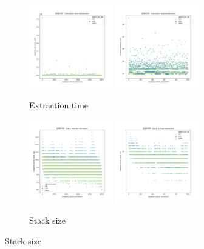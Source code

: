 \begin{figure}
    \begin{subfigure}[b]{\textwidth}
        \centering
        \includegraphics[width=0.40\textwidth]{./fragments/05_workhorse_experiment/images/01_basebenchmark_01_random_case.png.1_0.png}
        \includegraphics[width=0.40\textwidth]{./fragments/05_workhorse_experiment/images/01_basebenchmark_01_random_case.png.1_1.png}
        \caption{Extraction time}
        \label{FIG:WORKHORSE_BENCHMARK_01__0_0}
    \end{subfigure}

    \begin{subfigure}[b]{\textwidth}
        \centering
        \includegraphics[width=0.40\textwidth]{./fragments/05_workhorse_experiment/images/01_basebenchmark_01_random_case.png.2_0.png}
        \includegraphics[width=0.40\textwidth]{./fragments/05_workhorse_experiment/images/01_basebenchmark_01_random_case.png.2_1.png}
        \caption{Stack size}
        \label{FIG:WORKHORSE_BENCHMARK_01__0_0}
    \end{subfigure}
    

\end{figure}
